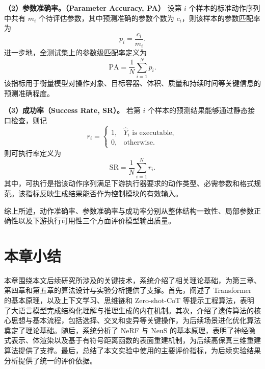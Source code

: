 \textbf{（2）参数准确率。（Parameter Accuracy, PA）}
设第 $i$ 个样本的标准动作序列中共有 $m_i$ 个待评估参数，其中预测准确的参数个数为 $c_i$，则该样本的参数匹配率为
\[
p_i=\frac{c_i}{m_i}.
\]
进一步地，全测试集上的参数级匹配率定义为
\begin{equation}
\mathrm{PA}=\frac{1}{N}\sum_{i=1}^{N} p_i .
\label{eq:param_match_rate}
\end{equation}
该指标用于衡量模型对操作对象、目标容器、体积、质量和持续时间等关键信息的预测准确程度。

\textbf{（3）成功率（Success Rate, SR）。}
若第 $i$ 个样本的预测结果能够通过静态接口检查，则记
\[
r_i=
\begin{cases}
1, & \hat{Y}_i \text{ is executable},\\
0, & \text{otherwise}.
\end{cases}
\]
则可执行率定义为
\begin{equation}
\mathrm{SR}=\frac{1}{N}\sum_{i=1}^{N} r_i .
\label{eq:executability_rate}
\end{equation}
其中，可执行是指该动作序列满足下游执行器要求的动作类型、必需参数和格式规范。该指标反映生成结果能否作为控制模块的有效输入。

综上所述，动作准确率、参数准确率与成功率分别从整体结构一致性、局部参数正确性以及下游执行可用性三个方面评价模型输出质量。

\section{本章小结}

本章围绕本文后续研究所涉及的关键技术，系统介绍了相关理论基础，为第三章、第四章和第五章的算法设计与实验分析提供了支撑。首先，阐述了 Transformer 的基本原理，以及上下文学习、思维链和 Zero-shot-CoT 等提示工程算法，表明了大语言模型完成结构化理解与推理生成的内在机制。其次，介绍了遗传算法的核心思想与基本流程，包括选择、交叉和变异等关键操作，为后续场景进化优化算法奠定了理论基础。随后，系统分析了 NeRF 与 NeuS 的基本原理，表明了神经隐式表示、体渲染以及基于有符号距离函数的表面重建机制，为后续高保真三维重建算法提供了支撑。最后，总结了本文实验中使用的主要评价指标，为后续实验结果分析提供了统一的评价依据。